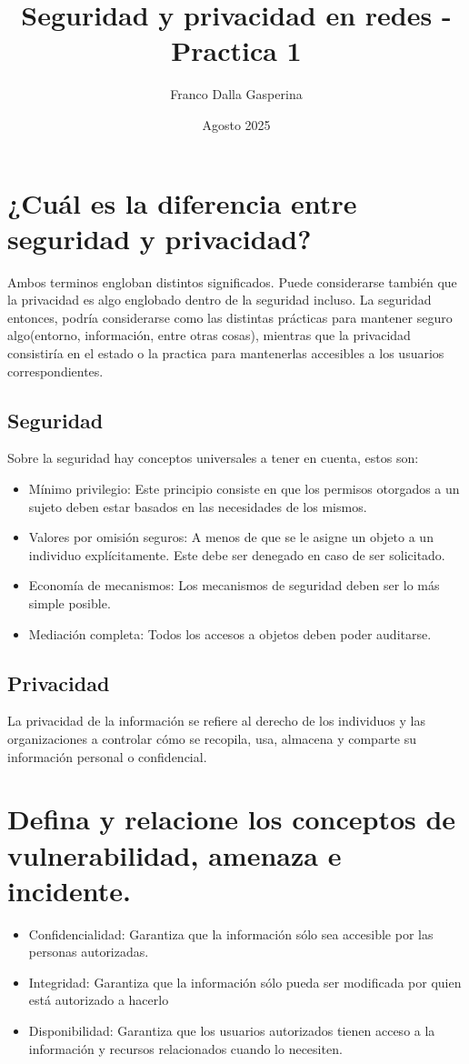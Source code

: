 \documentclass{article}
\author{Franco Dalla Gasperina}
\title{Seguridad y privacidad en redes - Practica 1}
\date {Agosto 2025}
\begin{document}
	\maketitle
	\section{¿Cuál es la diferencia entre seguridad y privacidad?}
		Ambos terminos engloban distintos significados. Puede considerarse también que la privacidad es algo englobado dentro de la seguridad incluso.
		La seguridad entonces, podría considerarse como las distintas prácticas para mantener seguro algo(entorno, información, entre otras cosas), mientras que la privacidad consistiría en el estado o la practica para mantenerlas accesibles a los usuarios correspondientes.
		\subsection{Seguridad}
			Sobre la seguridad hay conceptos universales a tener en cuenta, estos son: 
		\begin{itemize}
			\item Mínimo privilegio:
			Este principio consiste en que los permisos otorgados a un sujeto deben estar basados en las necesidades de los mismos.
			
			\item Valores por omisión seguros:
			A menos de que se le asigne un objeto a un individuo explícitamente. Este debe ser denegado en caso de ser solicitado.
			
			\item Economía de mecanismos:
			Los mecanismos de seguridad deben ser lo más simple posible.
			
			\item Mediación completa:
			Todos los accesos a objetos deben poder auditarse. 
		\end{itemize}
		\subsection{Privacidad}
			La privacidad de la información se refiere al derecho
			de los individuos y las organizaciones a controlar cómo
			se recopila, usa, almacena y comparte su
			información personal o confidencial.
	\section{Defina y relacione los conceptos de vulnerabilidad, amenaza e incidente.}
		\begin{itemize}
			\item Confidencialidad: Garantiza que la información sólo sea
			accesible por las personas autorizadas.
			
			\item Integridad: Garantiza que la información sólo pueda ser
			modificada por quien está autorizado a hacerlo
			
			\item Disponibilidad: Garantiza que los usuarios autorizados
			tienen acceso a la información y recursos relacionados
			cuando lo necesiten. 
		\end{itemize}
\end{document}
